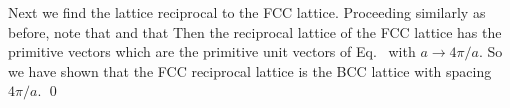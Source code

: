 {	Next we find the lattice reciprocal to the FCC lattice.  Proceeding similarly as before, note that
	and that
	Then the reciprocal lattice of the FCC lattice has the primitive vectors
	which are the primitive unit vectors of Eq.~ with $a \to 4\pi / a$.  So we have shown that the FCC reciprocal lattice is the BCC lattice with spacing $4\pi / a$. \qed
}
